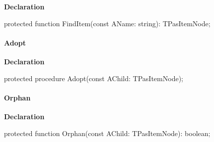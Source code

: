 \documentclass{report}
\newif\ifpdf
\begin{document}
\label{PasDoc_HierarchyTree.TPasItemNode-FindItem}
\begin{list}{}{
\setlength{\itemindent}{0cm}
\setlength{\listparindent}{0cm}
\setlength{\leftmargin}{\evensidemargin}
\addtolength{\leftmargin}{\tmplength}
\settowidth{\labelsep}{X}
\addtolength{\leftmargin}{\labelsep}
\setlength{\labelwidth}{\tmplength}
}
\item[\textbf{Declaration}\hfill]
\ifpdf
\begin{flushleft}
\fi
\begin{ttfamily}
protected function FindItem(const AName: string): TPasItemNode;\end{ttfamily}

\ifpdf
\end{flushleft}
\fi

\end{list}
\paragraph*{Adopt}\hspace*{\fill}

\label{PasDoc_HierarchyTree.TPasItemNode-Adopt}
\begin{list}{}{
\setlength{\itemindent}{0cm}
\setlength{\listparindent}{0cm}
\setlength{\leftmargin}{\evensidemargin}
\addtolength{\leftmargin}{\tmplength}
\settowidth{\labelsep}{X}
\addtolength{\leftmargin}{\labelsep}
\setlength{\labelwidth}{\tmplength}
}
\item[\textbf{Declaration}\hfill]
\ifpdf
\begin{flushleft}
\fi
\begin{ttfamily}
protected procedure Adopt(const AChild: TPasItemNode);\end{ttfamily}

\ifpdf
\end{flushleft}
\fi

\end{list}
\paragraph*{Orphan}\hspace*{\fill}

\label{PasDoc_HierarchyTree.TPasItemNode-Orphan}
\begin{list}{}{
\setlength{\itemindent}{0cm}
\setlength{\listparindent}{0cm}
\setlength{\leftmargin}{\evensidemargin}
\addtolength{\leftmargin}{\tmplength}
\settowidth{\labelsep}{X}
\addtolength{\leftmargin}{\labelsep}
\setlength{\labelwidth}{\tmplength}
}
\item[\textbf{Declaration}\hfill]
\ifpdf
\begin{flushleft}
\fi
\begin{ttfamily}
protected function Orphan(const AChild: TPasItemNode): boolean;\end{ttfamily}

\ifpdf
\end{flushleft}
\fi

\end{list}
\end{document}
